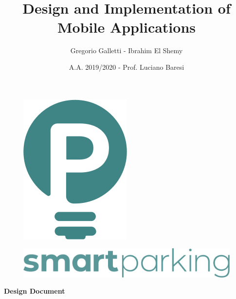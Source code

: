 \documentclass[11pt]{article} %
\title{Design and Implementation of Mobile Applications}
\author{Gregorio Galletti - Ibrahim El Shemy}
\date{A.A. 2019/2020 - Prof. Luciano Baresi} %
\begin{document}

\begin{figure}[H]
\vspace{60mm} 

\centering
\includegraphics[scale=0.3]{logoP_green.png}
\end{figure}
\begin{figure}[H]
\centering
\includegraphics[width=\textwidth,height=\textheight,keepaspectratio]{logoText_green.png}
\end{figure}
\vspace{60mm} 
\begin{center}
\huge \textbf{Design Document}
\end{center}

\maketitle
{}%

\tableofcontents
\newpage
\end{document}
